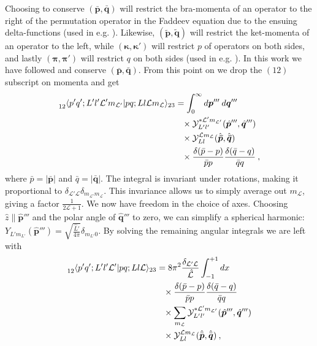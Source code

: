 \documentclass[aps,prc,showpacs,twocolumn,floatfix,nobibnotes,nofootinbib,amsmath,amssymb,longbibliography]{revtex4-2}
\begin{document}
Choosing to conserve $(\bm{\bar{p}},\bm{\bar{q}})$ will
restrict the bra-momenta of an operator to the right of the
permutation operator in the Faddeev equation due to the ensuing
delta-functions (used in
e.g. \cite{Hebeler:2020ocj,Gloeckle:1995jg}). Likewise,
$(\bm{\tilde{p}},\bm{\tilde{q}})$ will restrict the ket-momenta of an
operator to the left, while $(\bm{\kappa},\bm{\kappa}')$ will restrict
$p$ of operators on both sides, and lastly $(\bm{\pi},\bm{\pi}')$ will
restrict $q$ on both sides (used in
e.g. \cite{glockle1983quantum,Pomerantsev:2014ija}).
In this work we have followed \cite{Hebeler:2020ocj}
and conserve $(\bm{\bar{p}},\bm{\bar{q}})$. From this point on we drop
the $(12)$ subscript on momenta and get
\begin{align}
	\begin{split}
	\prescript{}{12}{\langle} p'q';L'l'\mathcal{L}'m_{\mathcal{L}'}|pq;Ll\mathcal{L}m_{\mathcal{L}}\rangle_{23} &= \int_0^\infty d\bm{p}'''\:d\bm{q}'''\\
	&\hphantom{=}\times \mathcal{Y}_{L'l'}^{*\mathcal{L}'m_{\mathcal{L}'}}(\hat{\bm{p}}''',\hat{\bm{q}}''')\\
	&\hphantom{=}\times \mathcal{Y}_{Ll}^{\mathcal{L}m_{\mathcal{L}}}(\hat{\bm{\bar{p}}},\hat{\bm{\bar{q}}}) \\
	&\hphantom{=}\times \frac{\delta(\bar{p}-p)}{\bar{p}p}\frac{\delta(\bar{q}-q)}{\bar{q}q} \:,
	\end{split}
	\label{eq | permutation matrix element calculation step 2}
\end{align}
where $\bar{p} = |\bar{\bm{p}}|$ and $\bar{q} = |\bar{\bm{q}}|$. The
integral is invariant under rotations, making it proportional to
$\delta_{\mathcal{L}'\mathcal{L}}\delta_{m_{\mathcal{L}'}m_{\mathcal{L}}}$.
This invariance allows us to simply average
out $m_\mathcal{L}$, giving a factor $\frac{1}{2\mathcal{L}+1}$. We now
have freedom in the choice of axes. Choosing
$\hat{z}\parallel\bm{\hat{p}}'''$ and the polar angle of
$\hat{\bm{q}}'''$ to zero, we can simplify a spherical harmonic:
$Y_{L'm_{L'}}(\hat{\bm{p}}''')=\sqrt{\frac{\hat{L}'}{4\pi}}\delta_{m_{L'}0}$. By
solving the remaining angular integrals we are left with
\begin{align}
	\begin{split}
	\prescript{}{12}{\langle} p'q';L'l'\mathcal{L}'|pq;Ll\mathcal{L}\rangle_{23}
	&= 8\pi^2\frac{\delta_{\mathcal{L}'\mathcal{L}}}{\hat{\mathcal{L}}}\int_{-1}^{+1} dx \\
	&\hphantom{=}\times \frac{\delta(\bar{p}-p)}{\bar{p}p}\frac{\delta(\bar{q}-q)}{\bar{q}q} \\
	&\hphantom{=}\times \sum_{m_{\mathcal{L}}}\mathcal{Y}_{L'l'}^{*\mathcal{L}'m_{\mathcal{L}'}}(\hat{\bm{p}}''',\hat{\bm{q}}''')\\
	&\hphantom{=}\times \mathcal{Y}_{Ll}^{\mathcal{L}m_{\mathcal{L}}}(\hat{\bar{\bm{p}}},\hat{\bar{\bm{q}}}) \:,
	\end{split}
        \label{eq | angle}
\end{align}
\end{document}
